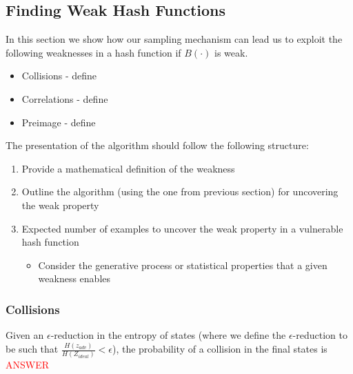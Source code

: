 \subsection{Finding Weak Hash Functions}
In this section we show how our sampling mechanism can lead us to exploit the following weaknesses in a hash function if $B(\cdot)$ is weak.

\begin{itemize}
\item Collisions - define
\item Correlations - define
\item Preimage - define
\end{itemize}


The presentation of the algorithm should follow the following structure:
\begin{enumerate}
\item Provide a mathematical definition of the weakness
\item Outline the algorithm (using the one from previous section) for uncovering the weak property
\item Expected number of examples to uncover the weak property in a vulnerable hash function
\begin{itemize}
\item Consider the generative process or statistical properties that a given weakness enables
\end{itemize}
\end{enumerate}

\subsubsection{Collisions}
\begin{theorem}
Given an $\epsilon$-reduction in the entropy of states (where we define the $\epsilon$-reduction to be such that $\frac{H(z_{adv})}{H(Z_{ideal})} < \epsilon$), the probability of a collision in the final states is \textcolor{red}{ANSWER}
\end{theorem}

